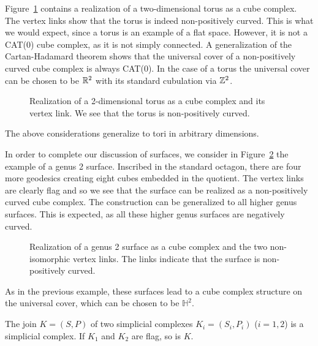 \begin{bsp}[Torus]
  \label{bsp:ccc-torus}
  Figure~\ref{fig:torus} contains a realization of a two-dimensional torus as a cube complex. The vertex links show that the torus is indeed non-positively curved. This is what we would expect, since a torus is an example of a flat space. However, it is not a CAT(0) cube complex, as it is not simply connected. A generalization of the Cartan-Hadamard theorem shows that the universal cover of a non-positively curved cube complex is always CAT(0). In the case of a torus the universal cover can be chosen to be \(\mathbb{R}^2\) with its standard cubulation via \(\mathbb{Z}^2\).
  \begin{figure}[htbp]
    \centering
    
    \caption{Realization of a 2-dimensional torus as a cube complex and its vertex link. We see that the torus is non-positively curved.}
    \label{fig:torus}
  \end{figure}

  The above considerations generalize to tori in arbitrary dimensions.
\end{bsp}
\begin{bsp}
  \label{bsp:ccc-genus-2}
  In order to complete our discussion of surfaces, we consider in Figure~\ref{fig:genus-2} the example of a genus 2 surface. Inscribed in the standard octagon, there are four more geodesics creating eight cubes embedded in the quotient. The vertex links are clearly flag and so we see that the surface can be realized as a non-positively curved cube complex. The construction can be generalized to all higher genus surfaces. This is expected, as all these higher genus surfaces are negatively curved.
  \begin{figure}[htbp]
    \centering
    
    \caption{Realization of a genus 2 surface as a cube complex and the two non-isomorphic vertex links. The links indicate that the surface is non-positively curved.}
    \label{fig:genus-2}
  \end{figure}

  As in the previous example, these surfaces lead to a cube complex structure on the universal cover, which can be chosen to be \(\mathbb{H}^2\).
\end{bsp}

\begin{lemma}
  \label{lem:flag}
  The join \(K = (S,P)\) of two simplicial complexes \(K_i = (S_i, P_i)\) (\(i=1,2\)) is a simplicial complex. If \(K_1\) and \(K_2\) are flag, so is \(K\).
\end{lemma}

